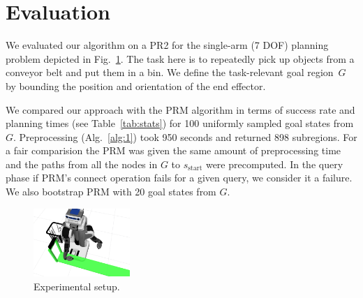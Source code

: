 \documentclass[letterpaper, 10 pt, conference]{ieeeconf}  %
\begin{document}


\section{Evaluation}
We evaluated our algorithm on a PR2 for the single-arm (7 DOF) planning problem depicted in Fig.~\ref{fig:sim}. The task here is to repeatedly pick up objects from a conveyor belt and put them in a bin. 
We define the task-relevant goal region~$G$ by bounding the position and orientation of the end effector. 


We compared our approach with the \textsf{PRM} algorithm in terms of success rate and planning times (see Table~\ref{tab:stats}) for 100 uniformly sampled goal states from $G$. 
Preprocessing (Alg.~\ref{alg:1}) took 950 seconds and returned 898 subregions. For a fair comparision the \textsf{PRM} was given the same amount of preprocessing time and the paths from all the nodes in $G$ to $s_{\text{start}}$ were precomputed. 
In the query phase if \textsf{PRM}'s connect operation fails for a given query, we consider it a failure. 
We also bootstrap \textsf{PRM} with 20 goal states from $G$. 


\begin{figure}[tb]
  \centering
    \includegraphics[width=0.325\textwidth]{simulation2.png}
  \caption{
  Experimental setup.
}
    \label{fig:sim}
 \vspace{-3mm}
\end{figure}



%



\end{document}
